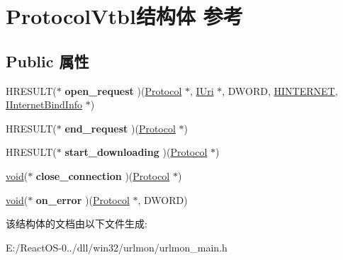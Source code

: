 \hypertarget{struct_protocol_vtbl}{}\section{Protocol\+Vtbl结构体 参考}
\label{struct_protocol_vtbl}
\subsection*{Public 属性}
\begin{DoxyCompactItemize}
\item 
\mbox{\label{struct_protocol_vtbl_a8b733adfd5dae5ccff830e301ddecb95}} 
H\+R\+E\+S\+U\+LT($\ast$ {\bfseries open\+\_\+request} )(\hyperlink{struct_protocol}{Protocol} $\ast$, \hyperlink{interface_i_uri}{I\+Uri} $\ast$, D\+W\+O\+RD, \hyperlink{interfacevoid}{H\+I\+N\+T\+E\+R\+N\+ET}, \hyperlink{interface_i_internet_bind_info}{I\+Internet\+Bind\+Info} $\ast$)
\item 
\mbox{\label{struct_protocol_vtbl_aa6e561e40f07a116b110cb77ea5f905e}} 
H\+R\+E\+S\+U\+LT($\ast$ {\bfseries end\+\_\+request} )(\hyperlink{struct_protocol}{Protocol} $\ast$)
\item 
\mbox{\label{struct_protocol_vtbl_a037cd54a32f53a1cfa95e650848d57fc}} 
H\+R\+E\+S\+U\+LT($\ast$ {\bfseries start\+\_\+downloading} )(\hyperlink{struct_protocol}{Protocol} $\ast$)
\item 
\mbox{\label{struct_protocol_vtbl_a533076164a9873c1415ebfee7b501c0e}} 
\hyperlink{interfacevoid}{void}($\ast$ {\bfseries close\+\_\+connection} )(\hyperlink{struct_protocol}{Protocol} $\ast$)
\item 
\mbox{\label{struct_protocol_vtbl_a1498d0729dcb5ab0561251f3437ab4c1}} 
\hyperlink{interfacevoid}{void}($\ast$ {\bfseries on\+\_\+error} )(\hyperlink{struct_protocol}{Protocol} $\ast$, D\+W\+O\+RD)
\end{DoxyCompactItemize}


该结构体的文档由以下文件生成\+:\begin{DoxyCompactItemize}
\item 
E\+:/\+React\+O\+S-\/0../dll/win32/urlmon/urlmon\+\_\+main.\+h\end{DoxyCompactItemize}
